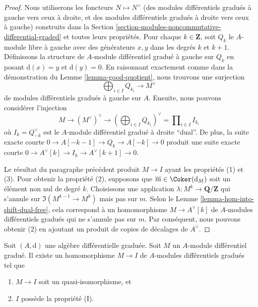 \begin{proof}
Nous utiliserons les foncteurs $N \mapsto N^\vee$ (des modules différentiels
gradués à gauche vers ceux à droite, et des modules différentiels gradués à droite
vers ceux à gauche) construits dans la Section
\ref{section-modules-noncommutative-differential-graded} et toutes leurs
propriétés. Pour chaque $k \in \mathbf{Z}$, soit $Q_k$ le $A$-module libre à
gauche avec des générateurs $x, y$ dans les degrés $k$ et $k + 1$. Définissons la
structure de $A$-module différentiel gradué à gauche sur $Q_k$ en posant
$\text{d}(x) = y$ et $\text{d}(y) = 0$. En raisonnant exactement comme dans la
démonstration du Lemme \ref{lemma-good-quotient}, nous trouvons une surjection
$$
\bigoplus\nolimits_{i \in I} Q_{k_i} \longrightarrow M^\vee
$$
de modules différentiels gradués à gauche sur $A$. Ensuite, nous pouvons considérer
l'injection
$$
M \to (M^\vee)^\vee \to (\bigoplus\nolimits_{i \in I} Q_{k_i})^\vee =
\prod\nolimits_{i \in I} I_{k_i}
$$
où $I_k = Q_{-k}^\vee$ est le $A$-module différentiel gradué à droite ``dual''. De
plus, la suite exacte courte $0 \to A[-k - 1] \to Q_k \to A[-k] \to 0$ produit une
suite exacte courte $0 \to A^\vee[k] \to I_k \to A^\vee[k + 1] \to 0$.

\medskip\noindent
Le résultat du paragraphe précédent produit $M \to I$ ayant les propriétés (1) et
(3). Pour obtenir la propriété (2), supposons que $\overline{m} \in
\Coker(\text{d}_M)$ soit un élément non nul de degré $k$. Choisissons une
application $\lambda : M^k \to \mathbf{Q}/\mathbf{Z}$ qui s'annule sur $\Im(M^{k -
1} \to M^k)$ mais pas sur $m$. Selon le Lemme
\ref{lemma-hom-into-shift-dual-free}, cela correspond à un homomorphisme $M \to
A^\vee[k]$ de $A$-modules différentiels gradués qui ne s'annule pas sur $m$. Par
conséquent, nous pouvons obtenir (2) en ajoutant un produit de copies de décalages
de $A^\vee$.
\end{proof}

\begin{lemma}
\label{lemma-right-resolution}
Soit $(A, \text{d})$ une algèbre différentielle graduée. Soit $M$ un $A$-module
différentiel gradué. Il existe un homomorphisme $M \to I$ de $A$-modules
différentiels gradués tel que
\begin{enumerate}
\item $M \to I$ soit un quasi-isomorphisme, et
\item $I$ possède la propriété (I).
\end{enumerate}
\end{lemma}

